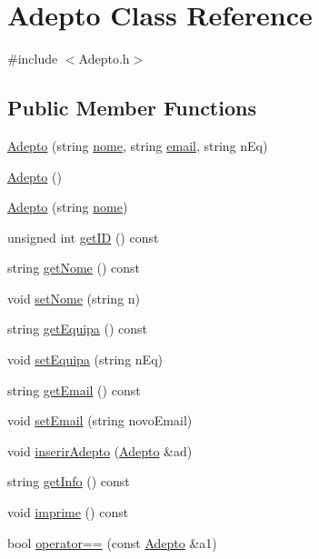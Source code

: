 \hypertarget{class_adepto}{}\section{Adepto Class Reference}
\label{class_adepto}


{\ttfamily \#include $<$Adepto.\+h$>$}

\subsection*{Public Member Functions}
\begin{DoxyCompactItemize}
\item 
\hyperlink{class_adepto_a544f7724e93beda5d7894ebb75aa5b38}{Adepto} (string \hyperlink{class_adepto_affdc168657d04f7c3622fda86815e195}{nome}, string \hyperlink{class_adepto_aad262806f93b5370f0619176929b8c2a}{email}, string n\+Eq)
\item 
\hyperlink{class_adepto_a3837c098f59e89d052cc74ce609d10d2}{Adepto} ()
\item 
\hyperlink{class_adepto_abf3f3fd153f85c802b709bba8f68b9f3}{Adepto} (string \hyperlink{class_adepto_affdc168657d04f7c3622fda86815e195}{nome})
\item 
unsigned int \hyperlink{class_adepto_a4fb9b0cd25432702e9bf4bc1594774c1}{get\+I\+D} () const 
\item 
string \hyperlink{class_adepto_aa655b5b5e1dcc07819d76140e69e0253}{get\+Nome} () const 
\item 
void \hyperlink{class_adepto_aa9e32095e7df2fd36397fed0ce703c58}{set\+Nome} (string n)
\item 
string \hyperlink{class_adepto_a89f0d930bde1684922ab7f75ae4a20a3}{get\+Equipa} () const 
\item 
void \hyperlink{class_adepto_a04d6c7667c430ae34e86e6ecbe0d8c1d}{set\+Equipa} (string n\+Eq)
\item 
string \hyperlink{class_adepto_ad3244a84912f4ff2034764f8c1a887d4}{get\+Email} () const 
\item 
void \hyperlink{class_adepto_a9c041dbfb8f2b822bb987e752996ce10}{set\+Email} (string novo\+Email)
\item 
void \hyperlink{class_adepto_ab10a21b804436408331e35b1c964ecee}{inserir\+Adepto} (\hyperlink{class_adepto}{Adepto} \&ad)
\item 
string \hyperlink{class_adepto_a345a20624756c6d52880a71f104d30ce}{get\+Info} () const 
\item 
void \hyperlink{class_adepto_a91073cf4e3d3044495d126e876533362}{imprime} () const 
\item 
bool \hyperlink{class_adepto_aac3192ff5a2aca2008d1393500a3bd00}{operator==} (const \hyperlink{class_adepto}{Adepto} \&a1)
\end{DoxyCompactItemize}
